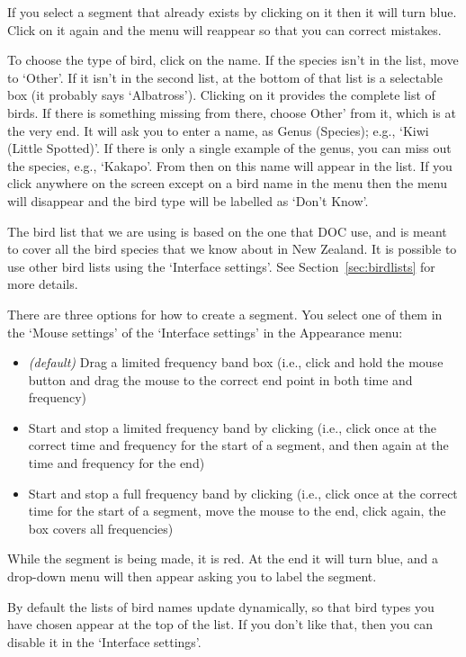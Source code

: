 \documentclass{article}
\begin{document}
If you select a segment that already exists by clicking on it then it will turn blue. Click on it again and the menu will reappear so that you can correct mistakes.

To choose the type of bird, click on the name. If the species isn't in the list, move to `Other'. If it isn't in the second list, at the bottom of that list is a selectable box (it probably says `Albatross'). Clicking on it provides the complete list of birds. If there is something missing from there, choose Other' from it, which is at the very end. It will ask you to enter a name, as Genus (Species); e.g., `Kiwi (Little Spotted)'. If there is only a single example of the genus, you can miss out the species, e.g., `Kakapo'. From then on this name will appear in the list. If you click anywhere on the screen except on a bird name in the menu then the menu will disappear and the bird type will be labelled as `Don't Know'. 

The bird list that we are using is based on the one that DOC use, and is meant to cover all the bird species that we know about in New Zealand. It is possible to use other bird lists using the `Interface settings'. See Section~\ref{sec:birdlists} for more details. 

There are three options for how to create a segment. You select one of them in the `Mouse settings' of the `Interface settings' in the Appearance menu:
	\begin{itemize}
	\item {\em (default)} Drag a limited frequency band box (i.e., click and hold the mouse button and drag the mouse to the correct end point in both time and frequency)
	\item Start and stop a limited frequency band by clicking (i.e., click once at the correct time and frequency for the start of a segment, and then again at the time and frequency for the end)
	\item Start and stop a full frequency band by clicking (i.e., click once at the correct time for the start of a segment, move the mouse to the end, click again, the box covers all frequencies)
	\end{itemize}

While the segment is being made, it is red. At the end it will turn blue, and a drop-down menu will then appear asking you to label the segment. 

By default the lists of bird names update dynamically, so that bird types you have chosen appear at the top of the list. If you don't like that, then you can disable it in the `Interface settings'. 
\end{document}
